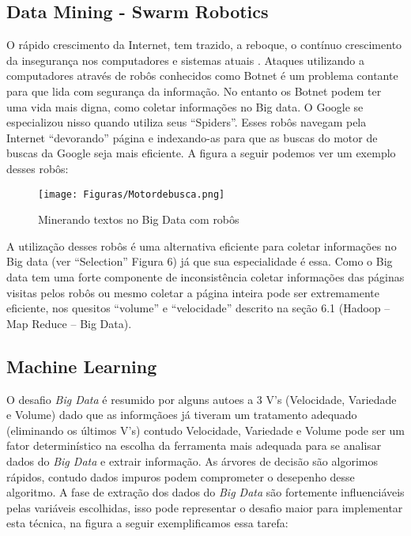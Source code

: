 \documentclass[conference,compsoc]{IEEEtran}
\begin{document}
\subsection{Data Mining - Swarm Robotics}\label{arte:palavraChave:Robotics}

O rápido crescimento da Internet, tem trazido, a reboque, o contínuo crescimento da insegurança nos computadores e sistemas atuais \cite{Barford2007}.
Ataques utilizando a computadores através de robôs conhecidos como Botnet é um problema contante para que lida com segurança da informação. No entanto os Botnet podem ter uma vida mais digna, como coletar informações no Big data. O Google se especializou nisso quando utiliza seus ``Spiders''. Esses robôs navegam pela Internet ``devorando'' página e indexando-as para que as buscas do motor de buscas da Google seja mais eficiente. A figura a seguir podemos ver um exemplo desses robôs: \cite{motorBusca}

\begin{figure}[!ht]
\centering
\caption{Minerando textos no Big Data com robôs}
\texttt{[image: Figuras/Motordebusca.png]}
\end{figure}

A utilização desses robôs é uma alternativa eficiente para coletar informações no Big data (ver ``Selection'' Figura 6) já que sua especialidade é essa. Como o Big data tem uma forte componente de inconsistência coletar informações das páginas visitas pelos robôs ou mesmo coletar a página inteira pode ser extremamente eficiente, nos quesitos ``volume'' e ``velocidade'' descrito na seção 6.1 (Hadoop -- Map Reduce -- Big Data). 





\subsection{Machine Learning}\label{arte:palavraChave:Machine}

O desafio \textit{Big Data} é resumido por alguns autoes a 3 V's (Velocidade, Variedade e Volume) dado que as informçãoes já tiveram um tratamento adequado (eliminando os últimos V's) contudo Velocidade, Variedade e Volume pode ser um fator determinístico na escolha da ferramenta mais adequada para se analisar dados do \textit{Big Data} e extrair informação. As árvores de decisão são algorimos rápidos, contudo dados impuros podem comprometer o desepenho desse algoritmo. A fase de extração dos dados do \textit{Big Data} são fortemente influenciáveis pelas variáveis escolhidas, \cite{DecisionTree} isso pode representar o desafio maior para implementar esta técnica, na figura a seguir exemplificamos essa tarefa:
\end{document}
